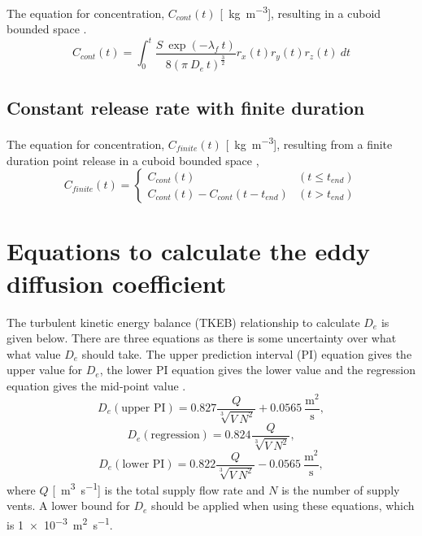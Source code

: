\documentclass[]{article}
\begin{document}
The equation for concentration, $C_{cont}(t)$
[\SI{}{\kilo\gram\per\meter\cubed}], resulting in a cuboid bounded space
\cite{cheng11}. 
\begin{equation}\label{eq:modelCont}
	C_{cont}(t) = \int^{t}_0  \frac{S\: \exp(-\lambda_f\:t)}{8(\pi\:D_e\:t)^{\frac{3}{2}}} r_{x}(t) r_{y}(t) r_{z}(t)\:dt
\end{equation}

\subsection{Constant release rate with finite duration}\label{sec:EddyFinite}

The equation for concentration, $C_{finite}(t)$
[\SI{}{\kilo\gram\per\meter\cubed}], resulting from a finite duration point
release in a cuboid bounded space \cite{foat20},
\begin{equation}\label{eq:modelFiniteDuration}
	C_{finite}(t) = 
	\begin{cases} 
		C_{cont}(t)															& (t \leq t_{end}) \\
		C_{cont}(t) - C_{cont}(t - t_{end})			& (t > t_{end})
	\end{cases} 
\end{equation}

\section{Equations to calculate the eddy diffusion coefficient}\label{app:tkeb}

The turbulent kinetic energy balance (TKEB) relationship to calculate $D_e$ is
given below. There are three equations as there is some uncertainty over what
what value $D_e$ should take. The upper prediction interval (PI) equation gives
the upper value for $D_e$, the lower PI equation gives the lower value and the
regression equation gives the mid-point value \cite{foat20}. 
\begin{equation}\label{eq:karlUpper}
	D_e(\text{upper PI}) = 0.827 \frac{Q}{\sqrt[3]{V\:N^2}} + 0.0565\:\frac{\text{m}^2}{\text{s}},
\end{equation}
\begin{equation}\label{eq:karlRegression}
	D_e(\text{regression}) = 0.824 \frac{Q}{\sqrt[3]{V\:N^2}},
\end{equation}
\begin{equation}\label{eq:karlLower}
	D_e(\text{lower PI}) = 0.822 \frac{Q}{\sqrt[3]{V\:N^2}} - 0.0565\:\frac{\text{m}^2}{\text{s}},
\end{equation}
where $Q$ [\SI{}{\meter\cubed\per\second}] is the total supply flow rate and $N$
is the number of supply vents. A lower bound for $D_e$ should be applied when
using these equations, which is \SI{1e-3}{\meter\squared\per\second}. 
\end{document}
